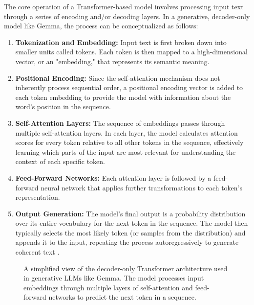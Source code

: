 The core operation of a Transformer-based model involves processing input text through a series of encoding and/or decoding layers. In a generative, decoder-only model like Gemma, the process can be conceptualized as follows:
\begin{enumerate}
    \item \textbf{Tokenization and Embedding:} Input text is first broken down into smaller units called tokens. Each token is then mapped to a high-dimensional vector, or an "embedding," that represents its semantic meaning.
    \item \textbf{Positional Encoding:} Since the self-attention mechanism does not inherently process sequential order, a positional encoding vector is added to each token embedding to provide the model with information about the word's position in the sequence.
    \item \textbf{Self-Attention Layers:} The sequence of embeddings passes through multiple self-attention layers. In each layer, the model calculates attention scores for every token relative to all other tokens in the sequence, effectively learning which parts of the input are most relevant for understanding the context of each specific token.
    \item \textbf{Feed-Forward Networks:} Each attention layer is followed by a feed-forward neural network that applies further transformations to each token's representation.
    \item \textbf{Output Generation:} The model's final output is a probability distribution over its entire vocabulary for the next token in the sequence. The model then typically selects the most likely token (or samples from the distribution) and appends it to the input, repeating the process autoregressively to generate coherent text \cite{FIND_CITATION_PLEASE}.
\end{enumerate}

\begin{figure}[htbp]
  \centering
  \caption{A simplified view of the decoder-only Transformer architecture used in generative LLMs like Gemma. The model processes input embeddings through multiple layers of self-attention and feed-forward networks to predict the next token in a sequence.}
  \label{fig:transformer_architecture}
\end{figure}

